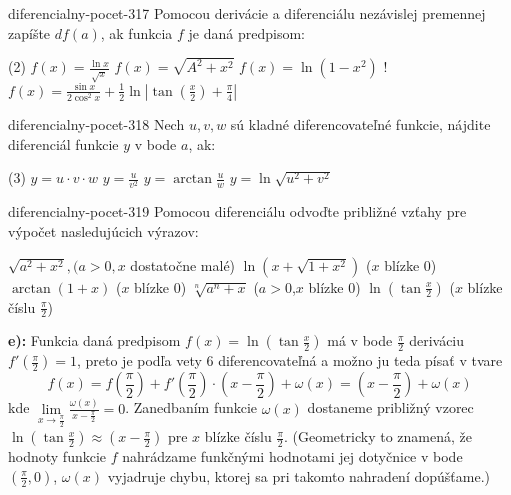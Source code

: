 \begin{defproblem}{diferencialny-pocet-317}
Pomocou derivácie a diferenciálu nezávislej premennej zapíšte $df(a)$, ak
funkcia $f$ je daná predpisom:
\begin{tasks}(2)
  \task $f(x)=\frac{\ln x}{\sqrt{x}}$
  \task $f(x)=\sqrt{A^2+x^2}$
  \task $f(x)=\ln (1-x^2)$
  \task!
    $f(x)=\frac{\sin x}{2\cos^2 x}+\frac{1}{2}\ln |\tan (\frac{x}{2})
    + \frac{\pi}{4}|$
\end{tasks}
\end{defproblem}

\begin{defproblem}{diferencialny-pocet-318}
Nech $u,v,w$ sú kladné diferencovateľné funkcie, nájdite diferenciál funkcie $y$
v bode $a$, ak:
\begin{tasks}(3)
  \task $y=u\cdot v\cdot w$
  \task $y=\frac{u}{v^2}$
  \task $y=\arctan \frac{u}{w}$
  \task $y=\ln \sqrt{u^2+v^2}$
\end{tasks}
\end{defproblem}

\begin{defproblem}{diferencialny-pocet-319}
Pomocou diferenciálu odvoďte približné vzťahy pre výpočet nasledujúcich výrazov:
\begin{tasks}
\task $\sqrt{a^2+x^2},(a>0,x$ dostatočne malé)
\task $\ln (x+\sqrt{1+x^2})$ ($x$ blízke $0$)
\task $\arctan (1+x)$ ($x$ blízke $0$)
\task $\sqrt[n]{a^n+x}$ ($a>0$,$x$ blízke $0$)
\task $\ln (\tan \frac{x}{2})$ ($x$ blízke číslu $\frac{\pi}{2}$)
\end{tasks}

\begin{solution}
  \textbf{e):}
  Funkcia daná predpisom $f(x)=\ln (\tan \frac{x}{2})$ má v bode $\frac{\pi}{2}$
  deriváciu $f'(\frac{\pi}{2})=1$, preto je podľa vety $6$ diferencovateľná a
  možno ju teda písať v tvare
  \[
    f(x)=f(\frac{\pi}{2})+f'(\frac{\pi}{2})\cdot
    (x-\frac{\pi}{2})+\omega(x)=(x-\frac{\pi}{2})+\omega(x)
  \]
  kde $\lim\limits_{x \rightarrow
  \frac{\pi}{2}}\frac{\omega(x)}{x-\frac{\pi}{2}}=0$. Zanedbaním funkcie
  $\omega(x)$ dostaneme približný vzorec $\ln (\tan \frac{x}{2})\approx
  (x-\frac{\pi}{2})$ pre $x$ blízke číslu $\frac{\pi}{2}$. (Geometricky to
  znamená, že hodnoty funkcie $f$ nahrádzame funkčnými hodnotami jej dotyčnice v
  bode $(\frac{\pi}{2},0)$, $\omega(x)$ vyjadruje chybu, ktorej sa pri takomto
  nahradení dopúšťame.)
\end{solution}
\end{defproblem}

